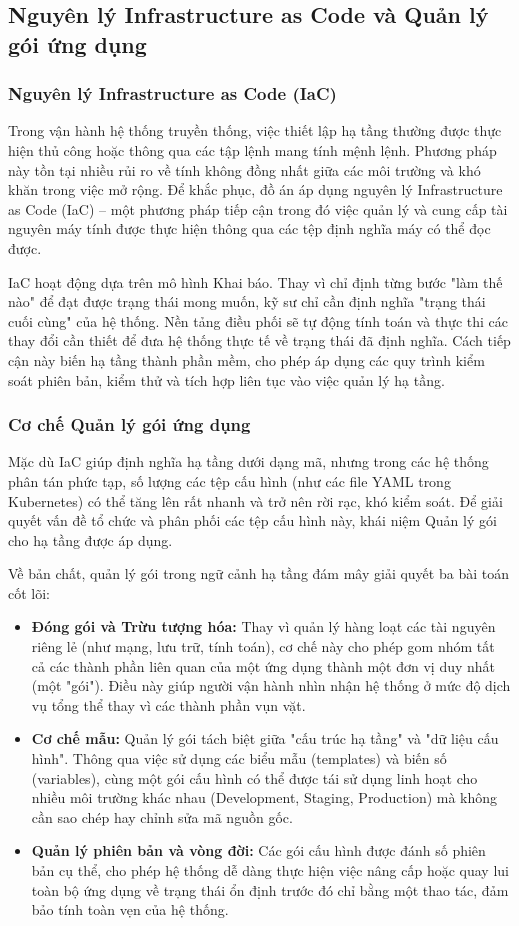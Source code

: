 \subsection{Nguyên lý Infrastructure as Code và Quản lý gói ứng dụng}

\subsubsection{Nguyên lý Infrastructure as Code (IaC)} Trong vận hành hệ thống truyền thống, việc thiết lập hạ tầng thường được thực hiện thủ công hoặc thông qua các tập lệnh mang tính mệnh lệnh. Phương pháp này tồn tại nhiều rủi ro về tính không đồng nhất giữa các môi trường và khó khăn trong việc mở rộng. Để khắc phục, đồ án áp dụng nguyên lý Infrastructure as Code (IaC) – một phương pháp tiếp cận trong đó việc quản lý và cung cấp tài nguyên máy tính được thực hiện thông qua các tệp định nghĩa máy có thể đọc được.

IaC hoạt động dựa trên mô hình Khai báo. Thay vì chỉ định từng bước "làm thế nào" để đạt được trạng thái mong muốn, kỹ sư chỉ cần định nghĩa "trạng thái cuối cùng" của hệ thống. Nền tảng điều phối sẽ tự động tính toán và thực thi các thay đổi cần thiết để đưa hệ thống thực tế về trạng thái đã định nghĩa. Cách tiếp cận này biến hạ tầng thành phần mềm, cho phép áp dụng các quy trình kiểm soát phiên bản, kiểm thử và tích hợp liên tục vào việc quản lý hạ tầng.

\subsubsection{Cơ chế Quản lý gói ứng dụng} Mặc dù IaC giúp định nghĩa hạ tầng dưới dạng mã, nhưng trong các hệ thống phân tán phức tạp, số lượng các tệp cấu hình (như các file YAML trong Kubernetes) có thể tăng lên rất nhanh và trở nên rời rạc, khó kiểm soát. Để giải quyết vấn đề tổ chức và phân phối các tệp cấu hình này, khái niệm Quản lý gói cho hạ tầng được áp dụng.

Về bản chất, quản lý gói trong ngữ cảnh hạ tầng đám mây giải quyết ba bài toán cốt lõi: 
\begin{itemize} 
    \item \textbf{Đóng gói và Trừu tượng hóa:} Thay vì quản lý hàng loạt các tài nguyên riêng lẻ (như mạng, lưu trữ, tính toán), cơ chế này cho phép gom nhóm tất cả các thành phần liên quan của một ứng dụng thành một đơn vị duy nhất (một "gói"). Điều này giúp người vận hành nhìn nhận hệ thống ở mức độ dịch vụ tổng thể thay vì các thành phần vụn vặt. 
    \item \textbf{Cơ chế mẫu:} Quản lý gói tách biệt giữa "cấu trúc hạ tầng" và "dữ liệu cấu hình". Thông qua việc sử dụng các biểu mẫu (templates) và biến số (variables), cùng một gói cấu hình có thể được tái sử dụng linh hoạt cho nhiều môi trường khác nhau (Development, Staging, Production) mà không cần sao chép hay chỉnh sửa mã nguồn gốc. 
    \item \textbf{Quản lý phiên bản và vòng đời:} Các gói cấu hình được đánh số phiên bản cụ thể, cho phép hệ thống dễ dàng thực hiện việc nâng cấp hoặc quay lui toàn bộ ứng dụng về trạng thái ổn định trước đó chỉ bằng một thao tác, đảm bảo tính toàn vẹn của hệ thống. 
\end{itemize}